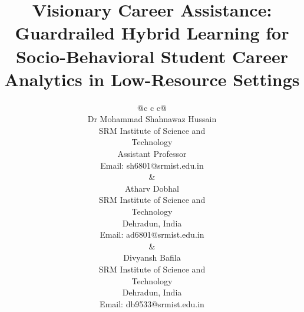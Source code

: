 \documentclass[conference]{IEEEtran}
\begin{document}
\title{Visionary Career Assistance: Guardrailed Hybrid Learning for Socio-Behavioral Student Career Analytics in Low-Resource Settings}

\author{
\begin{tabular*}{\textwidth}{@{\extracolsep{\fill}}c c c@{}}
\begin{tabular}[t]{c}
Dr Mohammad Shahnawaz Hussain\\
SRM Institute of Science and\\
Technology\\
Assistant Professor\\
Email: sh6801@srmist.edu.in
\end{tabular}
&
\begin{tabular}[t]{c}
Atharv Dobhal\\
SRM Institute of Science and\\
Technology\\
Dehradun, India\\
Email: ad6801@srmist.edu.in
\end{tabular}
&
\begin{tabular}[t]{c}
Divyansh Bafila\\
SRM Institute of Science and\\
Technology\\
Dehradun, India\\
Email: db9533@srmist.edu.in
\end{tabular}
\\[1.2em]
\end{tabular*}
}
\end{document}

